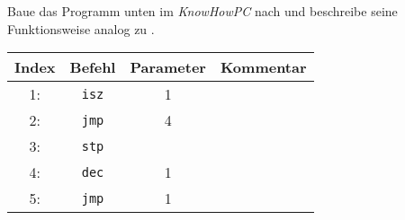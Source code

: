 \documentclass[10pt, a4paper]{scrartcl}
\begin{document}
\begin{aufgabe}[symbol=\symLaptop]
	Baue das Programm unten im \emph{KnowHowPC} nach und beschreibe seine Funktionsweise analog zu .

	\begin{center}
	\begin{tabularx}{.8\textwidth}{|c|c|c|X|}\hline
		\rowcolor{black!10}
		Index & Befehl & Parameter & Kommentar \\\hline
		1: & \texttt{isz} & 1 & \Zeilenabstand\\\hline
		2: & \texttt{jmp} & 4 & \Zeilenabstand\\\hline
		3: & \texttt{stp} &   & \Zeilenabstand\\\hline
		4: & \texttt{dec} & 1 & \Zeilenabstand\\\hline
		5: & \texttt{jmp} & 1 & \Zeilenabstand\\\hline
	\end{tabularx}
	\end{center}
\end{aufgabe}
\end{document}
